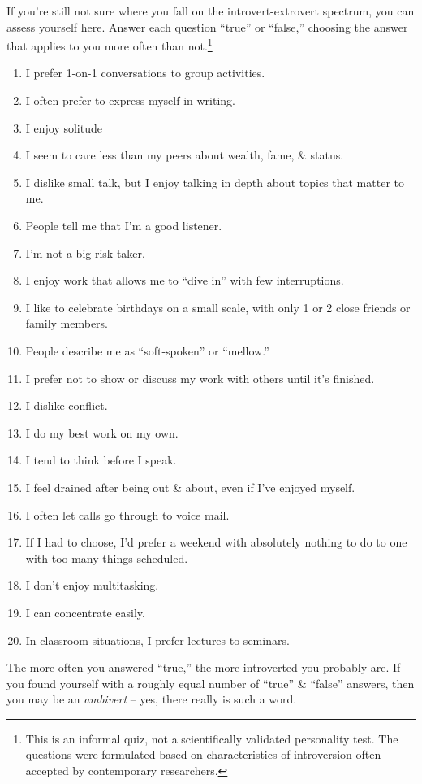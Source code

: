 \documentclass{article}
\numberwithin{equation}{section}
\begin{document}
If you're still not sure where you fall on the introvert-extrovert spectrum, you can assess yourself here. Answer each question ``true'' or ``false,'' choosing the answer that applies to you more often than not.\footnote{This is an informal quiz, not a scientifically validated personality test. The questions were formulated based on characteristics of introversion often accepted by contemporary researchers.}
\begin{enumerate}
	\item I prefer 1-on-1 conversations to group activities.
	\item I often prefer to express myself in writing.
	\item I enjoy solitude
	\item I seem to care less than my peers about wealth, fame, \& status.
	\item I dislike small talk, but I enjoy talking in depth about topics that matter to me.
	\item People tell me that I'm a good listener.
	\item I'm not a big risk-taker.
	\item I enjoy work that allows me to ``dive in'' with few interruptions.
	\item I like to celebrate birthdays on a small scale, with only 1 or 2 close friends or family members.
	\item People describe me as ``soft-spoken'' or ``mellow.''
	\item I prefer not to show or discuss my work with others until it's finished.
	\item I dislike conflict.
	\item I do my best work on my own.
	\item I tend to think before I speak.
	\item I feel drained after being out \& about, even if I've enjoyed myself.
	\item I often let calls go through to voice mail.
	\item If I had to choose, I'd prefer a weekend with absolutely nothing to do to one with too many things scheduled.
	\item I don't enjoy multitasking.
	\item I can concentrate easily.
	\item In classroom situations, I prefer lectures to seminars.
\end{enumerate}
The more often you answered ``true,'' the more introverted you probably are. If you found yourself with a roughly equal number of ``true'' \& ``false'' answers, then you may be an \textit{ambivert} -- yes, there really is such a word.
\end{document}
